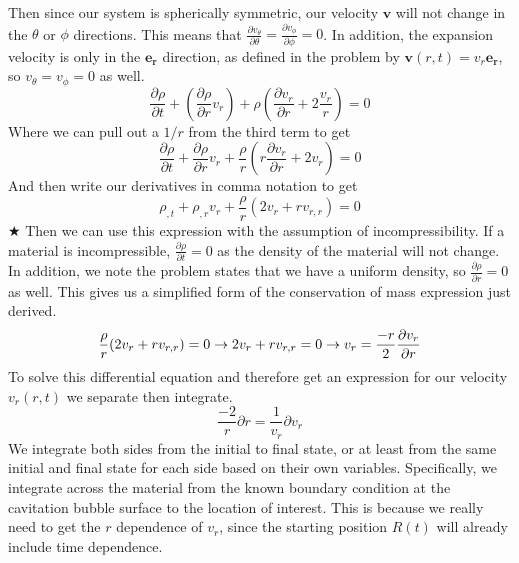 \documentclass[preprint,12pt,authoryear]{elsarticle}
\begin{document}
Then since our system is spherically symmetric, our velocity $\bm{v}$ will not change in the $\theta$ or $\phi$ directions. This means that $ \frac{\partial v_{\theta}}{\partial \theta}= \frac{\partial v_{\phi}}{\partial \phi} = 0$. In addition, the expansion velocity is only in the $\bm{e_r}$ direction, as defined in the problem by $\bm{v}(r,t) = v_r \bm{e_r}$, so $v_{\theta} = v_{\phi} =0$ as well.
\begin{equation}
    \frac{\partial \rho}{\partial t} + (\frac{\partial \rho}{\partial r}v_r) + \rho(\frac{\partial v_r}{\partial r} + 2\frac{v_r}{r})= 0
\end{equation}
Where we can pull out a $1/r$ from the third term to get
\begin{equation}
    \frac{\partial \rho}{\partial t} + \frac{\partial \rho}{\partial r}v_r + \frac{\rho}{r}(r\frac{\partial v_r}{\partial r} + 2v_r)= 0
\end{equation}
And then write our derivatives in comma notation to get
\begin{equation}
    \rho_{,t} + \rho_{,r}v_r + \frac{\rho}{r}(2v_r+rv_{r,r}) = 0
\end{equation}
\hspace*{\fill} $\bigstar$ \newline
\medskip
Then we can use this expression with the assumption of incompressibility. If a material is incompressible, $\frac{\partial \rho}{\partial t} = 0$ as the density of the material will not change. In addition, we note the problem states that we have a uniform density, so $\frac{\partial \rho}{\partial r} = 0$ as well. This gives us a simplified form of the conservation of mass expression just derived.
\begin{equation}
    \frac{\rho}{r}(2v_r+rv_{r,r}) = 0 \space \to \space 2v_r+rv_{r,r} = 0 \space \to \space v_r = \frac{-r}{2} \frac{\partial v_r}{\partial r}
\end{equation}
To solve this differential equation and therefore get an expression for our velocity $v_r(r,t)$ we separate then integrate.
\begin{equation}
    \frac{-2}{r} \partial r = \frac{1}{v_r} \partial v_r
\end{equation}
We integrate both sides from the initial to final state, or at least from the same initial and final state for each side based on their own variables. Specifically, we integrate across the material from the known boundary condition at the cavitation bubble surface to the location of interest. This is because we really need to get the $r$ dependence of $v_r$, since the starting position $R(t)$ will already include time dependence.
\end{document}
